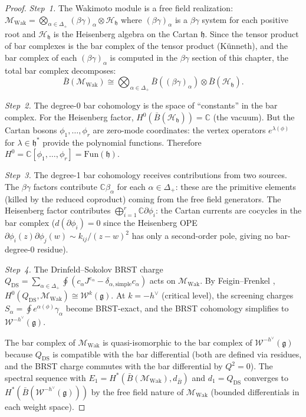 \begin{proof}
\emph{Step~1.}
The Wakimoto module is a free field realization: $\mathcal{M}_{\mathrm{Wak}} = \bigotimes_{\alpha \in \Delta_+} (\beta\gamma)_\alpha \otimes \mathcal{H}_{\mathfrak{h}}$ where $(\beta\gamma)_\alpha$ is a $\beta\gamma$ system for each positive root and $\mathcal{H}_{\mathfrak{h}}$ is the Heisenberg algebra on the Cartan $\mathfrak{h}$.  Since the tensor product of bar complexes is the bar complex of the tensor product (Künneth), and the bar complex of each $(\beta\gamma)_\alpha$ is computed in the $\beta\gamma$ section of this chapter, the total bar complex decomposes:
\[
\bar{B}(\mathcal{M}_{\mathrm{Wak}}) \cong \bigotimes_{\alpha \in \Delta_+} \bar{B}((\beta\gamma)_\alpha) \otimes \bar{B}(\mathcal{H}_{\mathfrak{h}}).
\]

\emph{Step~2.}
The degree-0 bar cohomology is the space of ``constants'' in the bar complex.  For the Heisenberg factor, $H^0(\bar{B}(\mathcal{H}_{\mathfrak{h}})) = \mathbb{C}$ (the vacuum).  But the Cartan bosons $\phi_1, \ldots, \phi_r$ are zero-mode coordinates: the vertex operators $e^{\lambda(\phi)}$ for $\lambda \in \mathfrak{h}^*$ provide the polynomial functions.  Therefore $H^0 = \mathbb{C}[\phi_1, \ldots, \phi_r] = \mathrm{Fun}(\mathfrak{h})$.

\emph{Step~3.}
The degree-1 bar cohomology receives contributions from two sources.  The $\beta\gamma$ factors contribute $\mathbb{C}\beta_\alpha$ for each $\alpha \in \Delta_+$: these are the primitive elements (killed by the reduced coproduct) coming from the free field generators.  The Heisenberg factor contributes $\bigoplus_{i=1}^r \mathbb{C}\partial\phi_i$: the Cartan currents are cocycles in the bar complex ($d(\partial\phi_i) = 0$ since the Heisenberg OPE $\partial\phi_i(z)\partial\phi_j(w) \sim k_{ij}/(z-w)^2$ has only a second-order pole, giving no bar-degree-0 residue).

\emph{Step~4.}
The Drinfeld--Sokolov BRST charge $Q_{\mathrm{DS}} = \sum_{\alpha \in \Delta_+} \oint (c_\alpha J^{e_\alpha} - \delta_{\alpha, \text{simple}} c_\alpha)$ acts on $\mathcal{M}_{\mathrm{Wak}}$.  By Feigin--Frenkel \cite{Feigin-Frenkel}, $H^0(Q_{\mathrm{DS}}, \mathcal{M}_{\mathrm{Wak}}) \cong \mathcal{W}^k(\mathfrak{g})$.  At $k = -h^\vee$ (critical level), the screening charges $S_\alpha = \oint e^{\alpha(\phi)}\gamma_\alpha$ become BRST-exact, and the BRST cohomology simplifies to $\mathcal{W}^{-h^\vee}(\mathfrak{g})$.

The bar complex of $\mathcal{M}_{\mathrm{Wak}}$ is quasi-isomorphic to the bar complex of $\mathcal{W}^{-h^\vee}(\mathfrak{g})$ because $Q_{\mathrm{DS}}$ is compatible with the bar differential (both are defined via residues, and the BRST charge commutes with the bar differential by $Q^2 = 0$).  The spectral sequence with $E_1 = H^*(\bar{B}(\mathcal{M}_{\mathrm{Wak}}), d_{\bar{B}})$ and $d_1 = Q_{\mathrm{DS}}$ converges to $H^*(\bar{B}(\mathcal{W}^{-h^\vee}(\mathfrak{g})))$ by the free field nature of $\mathcal{M}_{\mathrm{Wak}}$ (bounded differentials in each weight space).
\end{proof}
 
